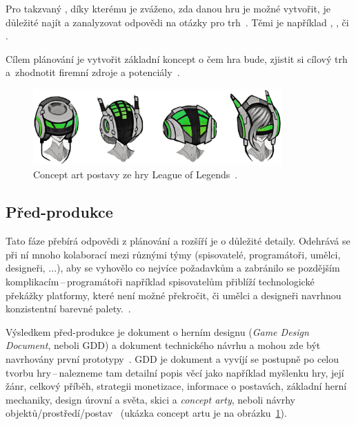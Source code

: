 Pro takzvaný , díky kterému je zváženo, zda danou hru je možné vytvořit, je důležité najít a zanalyzovat odpovědi na otázky pro trh~\cite{GameMaker_development}. Těmi je například , ,  či .

Cílem plánování je vytvořit základní koncept o čem hra bude, zjistit si cílový trh a~zhodnotit firemní zdroje a potenciály~\cite{novak2011game}.

\begin{figure}[hb]
    \centering
	\includegraphics[width=0.85\textwidth]{obrazky-figures/ch2/concept_art.png}
	\caption{Concept art postavy ze hry League of Legends~\cite{artLOLvol1}.}
	\label{fig:concept_art_lol}
\end{figure}

\subsection*{Před-produkce}
Tato fáze přebírá odpovědi z plánování a rozšíří je o důležité detaily. Odehrává se při ní mnoho kolaborací mezi různými týmy (spisovatelé, programátoři, umělci, designeři, ...), aby se vyhovělo co nejvíce požadavkům a zabránilo se pozdějším komplikacím\,--\,programátoři například spisovatelům přiblíží technologické překážky platformy, které není možné překročit, či umělci a designeři navrhnou konzistentní barevné palety.~\cite{g2_game_development}.

Výsledkem před-produkce je dokument o herním designu (\textit{Game Design Document}, neboli GDD) a dokument technického návrhu a mohou zde být navrhovány první prototypy~\cite{novak2011game}. GDD je  dokument a vyvíjí se postupně po celou tvorbu hry\,--\,nalezneme tam detailní popis věcí jako například myšlenku hry, její žánr, celkový příběh, strategii monetizace, informace o postavách, základní herní mechaniky, design úrovní a světa, skici a \textit{concept arty}, neboli návrhy objektů/prostředí/postav~\cite{CG_Spectrum_GAMEDEVELOPMENT} (ukázka concept artu je na obrázku~\ref{fig:concept_art_lol}).

